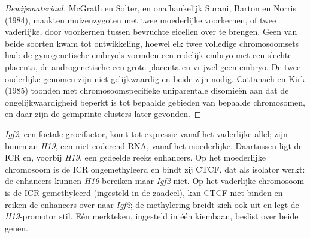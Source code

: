 \begin{proof}[Bewijsmateriaal]
McGrath en Solter, en onafhankelijk Surani, Barton en Norris (1984),
maakten muizenzygoten met twee moederlijke voorkernen, of twee
vaderlijke, door voorkernen tussen bevruchte eicellen over te brengen.
Geen van beide soorten kwam tot ontwikkeling, hoewel elk twee
volledige chromosoomsets had: de gynogenetische embryo's vormden een
redelijk embryo met een slechte placenta, de androgenetische een grote
placenta en vrijwel geen embryo. De twee ouderlijke genomen zijn niet
gelijkwaardig en beide zijn nodig. Cattanach en Kirk (1985) toonden
met chromosoomspecifieke uniparentale disomieën aan dat de
ongelijkwaardigheid beperkt is tot bepaalde gebieden van bepaalde
chromosomen, en daar zijn de geïmprinte clusters later gevonden.
\end{proof}

\begin{example}\label{ex:b3:chromatin-epigenetics:igf2}
\emph{Igf2}, een foetale groeifactor, komt tot expressie vanaf het
vaderlijke allel; zijn buurman \emph{H19}, een niet-coderend RNA,
vanaf het moederlijke. Daartussen ligt de ICR en, voorbij \emph{H19},
een gedeelde reeks enhancers. Op het moederlijke chromosoom is de ICR
ongemethyleerd en bindt zij CTCF, dat als isolator werkt: de enhancers
kunnen \emph{H19} bereiken maar \emph{Igf2} niet. Op het vaderlijke
chromosoom is de ICR gemethyleerd (ingesteld in de zaadcel), kan CTCF
niet binden en reiken de enhancers over naar \emph{Igf2}; de
methylering breidt zich ook uit en legt de \emph{H19}-promotor stil.
Eén merkteken, ingesteld in één kiembaan, beslist over beide genen.
\end{example}

